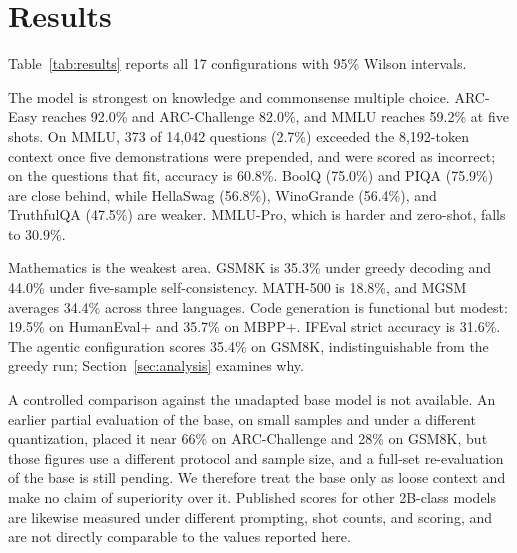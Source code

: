 \section{Results}
\label{sec:results}

Table~\ref{tab:results} reports all 17 configurations with 95\% Wilson intervals.

\begin{table}[t]
\centering
\caption{AVA-v2 across 17 benchmark configurations. Multiple-choice tasks use letter arg-max; generative tasks use greedy decoding, except the self-consistency row. All runs use the Q8\_0 GGUF.}
\label{tab:results}

\end{table}

The model is strongest on knowledge and commonsense multiple choice. ARC-Easy reaches 92.0\% and ARC-Challenge 82.0\%, and MMLU reaches 59.2\% at five shots. On MMLU, 373 of 14{,}042 questions (2.7\%) exceeded the 8{,}192-token context once five demonstrations were prepended, and were scored as incorrect; on the questions that fit, accuracy is 60.8\%. BoolQ (75.0\%) and PIQA (75.9\%) are close behind, while HellaSwag (56.8\%), WinoGrande (56.4\%), and TruthfulQA (47.5\%) are weaker. MMLU-Pro, which is harder and zero-shot, falls to 30.9\%.

Mathematics is the weakest area. GSM8K is 35.3\% under greedy decoding and 44.0\% under five-sample self-consistency. MATH-500 is 18.8\%, and MGSM averages 34.4\% across three languages. Code generation is functional but modest: 19.5\% on HumanEval+ and 35.7\% on MBPP+. IFEval strict accuracy is 31.6\%. The agentic configuration scores 35.4\% on GSM8K, indistinguishable from the greedy run; Section~\ref{sec:analysis} examines why.

A controlled comparison against the unadapted base model is not available. An earlier partial evaluation of the base, on small samples and under a different quantization, placed it near 66\% on ARC-Challenge and 28\% on GSM8K, but those figures use a different protocol and sample size, and a full-set re-evaluation of the base is still pending. We therefore treat the base only as loose context and make no claim of superiority over it. Published scores for other 2B-class models are likewise measured under different prompting, shot counts, and scoring, and are not directly comparable to the values reported here.

